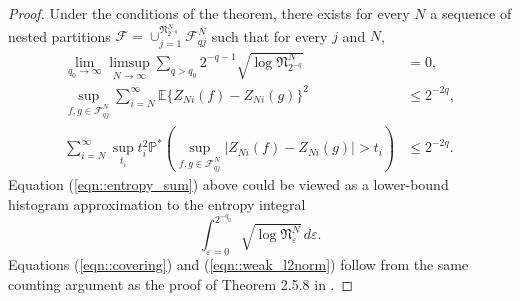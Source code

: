 \documentclass[11pt,a4paper]{article}
\newcommand{\E}{\mathbb{E}}
\renewcommand{\Pr}{\mathbb{P}}
\begin{document}
\begin{appendices}
\begin{proof}
    Under the conditions of the theorem, there exists for every $N$ a sequence of nested partitions $\mathcal{F} = \cup_{j=1}^{\mathfrak{N}_{2^{-q}}^{N}}\mathcal{F}_{qj}^{N}$ such that for every $j$ and $N$,
    \begin{align} \label{eqn::entropy_sum}
        \lim_{q_{0} \rightarrow \infty} \limsup_{N \rightarrow \infty} \sum_{q > q_{0}} 2^{-q-1} \sqrt{\log \mathfrak{N}_{2^{-q}}^{N}} &= 0, \\
        \label{eqn::covering} \sup_{f,g \in \mathcal{F}_{q j}^{N}} \sum_{i=N}^{\infty} \E\{Z_{Ni}(f) - Z_{Ni}(g)\}^{2} &\leq 2^{-2q},\\
        \label{eqn::weak_l2norm}\sum_{i=N}^{\infty} \sup_{t_{i}} t_{i}^{2} \Pr^{*}\left( \sup_{f,g \in \mathcal{F}_{q j}^{N}} |Z_{Ni}(f) - Z_{Ni}(g)| > t_{i}\right) &\leq 2^{-2q}.
    \end{align}
    Equation (\ref{eqn::entropy_sum}) above could be viewed as a lower-bound histogram approximation to the entropy integral
    $$\int_{\varepsilon = 0}^{2^{-q_{0}}}\sqrt{\log \mathfrak{N}_{\varepsilon}^{N}}\,d\varepsilon.$$ Equations (\ref{eqn::covering}) and (\ref{eqn::weak_l2norm}) follow from the same counting argument as the proof of Theorem 2.5.8 in \cite{vanderVaart2023}.


\end{proof}
\end{appendices}
\end{document}
